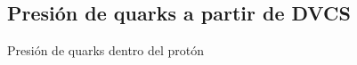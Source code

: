 \documentclass{beamer}
\begin{document}
\subsection{Presión de quarks a partir de DVCS}
\begin{frame}{Presión de quarks dentro del protón}
  \begin{columns}


\end{columns}
\end{frame}
\end{document}
